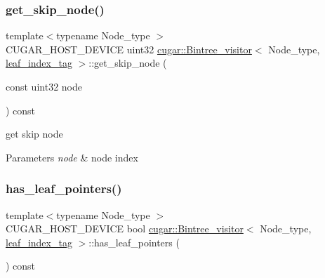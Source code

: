 \subsubsection{\texorpdfstring{get\+\_\+skip\+\_\+node()}{get\_skip\_node()}}
{\footnotesize\ttfamily template$<$typename Node\+\_\+type $>$ \\
C\+U\+G\+A\+R\+\_\+\+H\+O\+S\+T\+\_\+\+D\+E\+V\+I\+CE uint32 \hyperlink{structcugar_1_1_bintree__visitor}{cugar\+::\+Bintree\+\_\+visitor}$<$ Node\+\_\+type, \hyperlink{structcugar_1_1leaf__index__tag}{leaf\+\_\+index\+\_\+tag} $>$\+::get\+\_\+skip\+\_\+node (\begin{DoxyParamCaption}\item[{const uint32}]{node }\end{DoxyParamCaption}) const\hspace{0.3cm}{\ttfamily [inline]}}

get skip node


\begin{DoxyParams}{Parameters}
{\em node} & node index \\
\hline
\end{DoxyParams}
\mbox{\label{structcugar_1_1_bintree__visitor_3_01_node__type_00_01leaf__index__tag_01_4_aeb232ca294a219f6679e1d3e8ef54527}} 
\subsubsection{\texorpdfstring{has\+\_\+leaf\+\_\+pointers()}{has\_leaf\_pointers()}}
{\footnotesize\ttfamily template$<$typename Node\+\_\+type $>$ \\
C\+U\+G\+A\+R\+\_\+\+H\+O\+S\+T\+\_\+\+D\+E\+V\+I\+CE bool \hyperlink{structcugar_1_1_bintree__visitor}{cugar\+::\+Bintree\+\_\+visitor}$<$ Node\+\_\+type, \hyperlink{structcugar_1_1leaf__index__tag}{leaf\+\_\+index\+\_\+tag} $>$\+::has\+\_\+leaf\+\_\+pointers (\begin{DoxyParamCaption}{ }\end{DoxyParamCaption}) const\hspace{0.3cm}{\ttfamily [inline]}}

